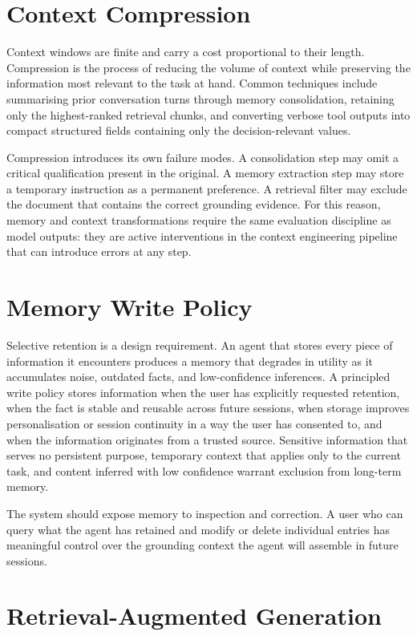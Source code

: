 \section{Context Compression}

Context windows are finite and carry a cost proportional to their length. Compression is
the process of reducing the volume of context while preserving the information most
relevant to the task at hand. Common techniques include summarising prior conversation
turns through memory consolidation, retaining only the highest-ranked retrieval chunks,
and converting verbose tool outputs into compact structured fields containing only the
decision-relevant values.

Compression introduces its own failure modes. A consolidation step may omit a critical
qualification present in the original. A memory extraction step may store a temporary
instruction as a permanent preference. A retrieval filter may exclude the document that
contains the correct grounding evidence. For this reason, memory and context
transformations require the same evaluation discipline as model outputs: they are active
interventions in the context engineering pipeline that can introduce errors at any step.

\section{Memory Write Policy}

Selective retention is a design requirement. An agent that stores every piece of
information it encounters produces a memory that degrades in utility as it accumulates
noise, outdated facts, and low-confidence inferences. A principled write policy stores
information when the user has explicitly requested retention, when the fact is stable and
reusable across future sessions, when storage improves personalisation or session
continuity in a way the user has consented to, and when the information originates from
a trusted source. Sensitive information that serves no persistent purpose, temporary
context that applies only to the current task, and content inferred with low confidence
warrant exclusion from long-term memory.

The system should expose memory to inspection and correction. A user who can query what
the agent has retained and modify or delete individual entries has meaningful control over
the grounding context the agent will assemble in future sessions.

\section{Retrieval-Augmented Generation}

